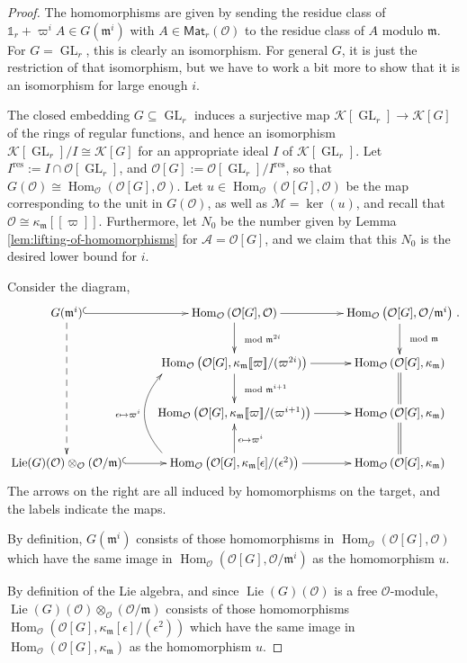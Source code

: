 \documentclass[10pt,a4paper]{amsart}
\theoremstyle{plain} %
\theoremstyle{definition}
\theoremstyle{remark}
\newcommand{\cA}{\mathcal{A}}
\newcommand{\cM}{\mathcal{M}}
\newcommand{\cK}{\mathcal{K}}   %
\newcommand{\cO}{\mathcal{O}}   %
\newcommand{\ck}{\kappa_\fm}        %
\newcommand{\fm}{\mathfrak{m}}  %
\newcommand{\Hom}{\operatorname{Hom}}
\newcommand{\Ker}{\operatorname{ker}}
\newcommand{\one}{\mathds{1}}
\newcommand{\res}{\operatorname{res}}
\newcommand{\Mat}{\mathsf{Mat}}
\newcommand{\GL}{\operatorname{GL}}
\newcommand{\Lie}{\operatorname{Lie}}
\newcommand{\ps}[1]{[\![#1]\!]}  %
\numberwithin{equation}{subsection}
\begin{document}
\begin{proof}
The homomorphisms are given by sending the residue class of $\one_r+\varpi^i A\in G(\fm^i)$ with $A\in \Mat_r(\cO)$ to the residue class of $A$ modulo $ \fm$. For $G=\GL_r$, this is clearly an isomorphism. For general $G$, it is just the restriction of that isomorphism, but we have to work a bit more to show that it is an isomorphism for large enough $i$.

The closed embedding $G\subseteq \GL_r$ induces a surjective map $\cK[\GL_r]\to \cK[G]$ of the rings of regular functions, and hence an isomorphism $\cK[\GL_r]/I\cong \cK[G]$ for an appropriate ideal $I$ of $\cK[\GL_r]$. 
Let $I^{\res}:=I\cap \cO[\GL_r]$, and $\cO[G]:=\cO[\GL_r]/I^{\res}$, so that $G(\cO)\cong \Hom_\cO(\cO[G],\cO)$. Let $u\in\Hom_\cO(\cO[G], \cO)$ be the map corresponding to the unit in $G(\cO)$, as well as $\cM=\Ker(u)$, and recall that $\cO\cong \ck\ps{\varpi}$.
Furthermore, let $N_0$ be the number given by Lemma \ref{lem:lifting-of-homomorphisms} for $\cA=\cO[G]$, and we claim that this $N_0$ is the desired lower bound for $i$.

Consider the diagram,
\[ \xymatrix{
    G(\fm^i) \ar@{^{(}->}[r] \ar@{-->}[ddd]& \Hom_\cO\left( \cO[G], \cO\right) \ar[r] \ar[d]^{\mod{\fm^{2i}}}&  \Hom_\cO\left( \cO[G], \cO/\fm^i\right) \ar[d]^{\mod{\fm}}\\
  & \Hom_\cO\left( \cO[G], \ck\ps{\varpi}/(\varpi^{2i})\right) \ar[r]
 \ar[d]^{\mod{\fm^{i+1}}}& \Hom_\cO\left( \cO[G], \ck\right) \\
  & \Hom_\cO\left( \cO[G], \ck\ps{\varpi}/(\varpi^{i+1})\right) \ar[r] & \Hom_\cO\left( \cO[G], \ck\right)  \ar@{=}[u] \\
  \Lie(G)(\cO)\otimes_\cO (\cO/\fm) \ar@{^{(}->}[r] & \Hom_\cO\left( \cO[G], \ck[\epsilon]/(\epsilon^{2})\right) \ar[r] \ar[u]_{\epsilon\mapsto \varpi^i} 
 \ar@/^2pc/@<12ex>[uu]^{\epsilon\mapsto \varpi^i} & \Hom_\cO\left( \cO[G], \ck\right) \ar@{=}[u]\\
}.\]
The arrows on the right are all induced by homomorphisms on the target, and the labels indicate the maps.

By definition, $G(\fm^i)$ consists of those homomorphisms in $\Hom_\cO\left( \cO[G], \cO\right)$ which have the same image in $\Hom_\cO\left( \cO[G], \cO/\fm^i\right)$ as the homomorphism $u$.

By definition of the Lie algebra, and since $\Lie(G)(\cO)$ is a free $\cO$-module, $\Lie(G)(\cO)\otimes_\cO (\cO/\fm)$ consists of those homomorphisms $\Hom_\cO\left( \cO[G], \ck[\epsilon]/(\epsilon^{2})\right)$ which have the same image in $\Hom_\cO\left( \cO[G], \ck\right)$ as the homomorphism $u$.


\end{proof}
\end{document}
